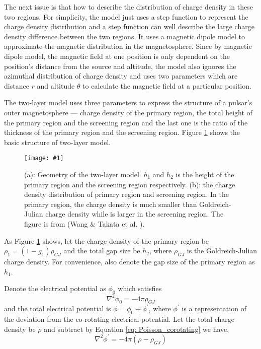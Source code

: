 \documentclass[12pt]{report}
\newcommand{\singleFig}[3]{
  \begin{figure}[!htp]
    \centering
    \texttt{[image: \#1]}
    \caption{#3}
    \label{fig: #1}
  \end{figure}
}
\newcommand{\myComment}[1]{
  \newline
}
\begin{document}
    The next issue is that how to describe the distribution of charge density in these two 
    regions. For simplicity, the model just uses a step function to represent the charge 
    density distribution and a step function can well describe the large charge density 
    difference between the two regions. It uses a magnetic dipole model to approximate the 
    magnetic distribution in the magnetosphere. Since by magnetic dipole model, the magnetic 
    field at one position is only dependent on the position's distance from the source 
    and altitude, the model also ignores the azimuthal distribution of charge density 
    and uses two parameters which are distance $r$ and altitude $\theta$ to calculate the 
    magnetic field at a particular position.

    The two-layer model uses three parameters to express the structure of a pulsar's outer 
    magnetosphere --- charge density of the primary region, the total height of the primary 
    region and the screening region and the last one is the ratio of the thickness of the 
    primary region and the screening region. Figure \ref{fig: charge_density} shows the 
    basic structure of two-layer model. 

    \singleFig{charge_density}{0.6}{(a): Geometry of the two-layer model. $h_{1}$ and 
      $h_{2}$ is the height of the primary region and the screening region respectively. 
      (b): the charge density distribution of primary region and screening region. In the primary 
      region, the charge density is much smaller than Goldreich-Julian charge density
      while is larger in the screening region. The figure is from 
      (Wang \& Takata et al. \cite{0004-637X-720-1-178}).}

    As Figure \ref{fig: charge_density} shows, 
    let the charge density of the primary region be $\rho_1 = (1-g_{1}) \rho_{GJ}$ and 
    the total gap size be
    $h_{2}$, where $\rho_{GJ}$ is the Goldreich-Julian charge density. For convenience, 
    also denote the gap size of the primary region as $h_{1}$. 
    \myComment{Then we can calculate electric potential and electric field by solving the 
    Poisson equation }
    Denote the electrical potential as $\phi_{0}$ which satisfies 
    \begin{equation}
      \label{eq: Poisson_corotating}
      \nabla^{2}\phi_{0} = -4\pi\rho_{GJ}
    \end{equation}
    and the total electrical potential is $\phi = \phi_{0} + \phi^{\prime}$, 
    where $\phi^{\prime}$ is a representation of the deviation from the co-rotating 
    electrical potential. Let the total charge density be $\rho$ and subtract by
    Equation \ref{eq: Poisson_corotating} we have,
    \begin{equation}
      \label{eq: Poisson_final}
      \nabla^{2}\phi^{\prime} = -4\pi\left(\rho - \rho_{GJ} \right)
    \end{equation}
\end{document}
